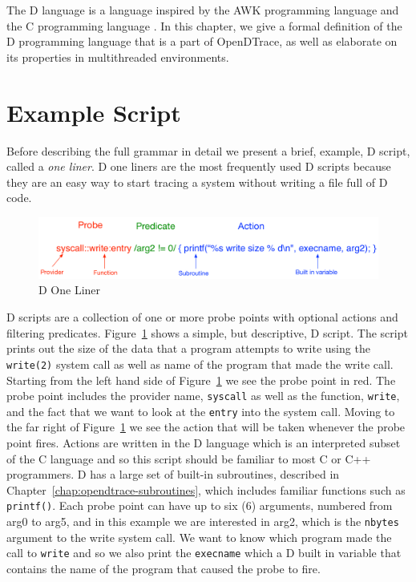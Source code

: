 The D language is a language inspired by the AWK programming language
\cite{Aho:1987:APL:29361} and the C programming language
\cite{DTrace2004}\cite{Kernighan:1988}. In this chapter, we give a
formal definition of the D programming language that is a part of
OpenDTrace, as well as elaborate on its properties in multithreaded
environments.

\section{Example Script}
\label{sec:example-script}

Before describing the full grammar in detail we present a brief,
example, D script, called a \emph{one liner}.  D one liners are the
most frequently used D scripts because they are an easy way to start
tracing a system without writing a file full of D code.


\begin{figure}
  \centering
  \includegraphics[width=0.8\linewidth]{oneliner.pdf}
  \caption{D One Liner}
  \label{fig:d-one-liner}
\end{figure}

D scripts are a collection of one or more probe points with optional
actions and filtering predicates.  Figure~\ref{fig:d-one-liner} shows
a simple, but descriptive, D script.  The script prints out the size
of the data that a program attempts to write using the
\texttt{write(2)} system call as well as name of the program that made
the write call.  Starting from the left hand side of
Figure~\ref{fig:d-one-liner} we see the probe point in red.  The probe
point includes the provider name, \texttt{syscall} as well as the
function, \texttt{write}, and the fact that we want to look at the
\texttt{entry} into the system call.  Moving to the far right of
Figure~\ref{fig:d-one-liner} we see the action that will be taken
whenever the probe point fires.  Actions are written in the D language
which is an interpreted subset of the C language and so this script
should be familiar to most C or C++ programmers.  D has a large set of
built-in subroutines, described in Chapter~\ref{chap:opendtrace-subroutines},
which includes familiar functions such as \texttt{printf()}.  Each
probe point can have up to six (6) arguments, numbered from arg0 to
arg5, and in this example we are interested in arg2, which is the
\texttt{nbytes} argument to the write system call.  We want to know
which program made the call to \texttt{write} and so we also print the
\texttt{execname} which a D built in variable that contains the name
of the program that caused the probe to fire.

